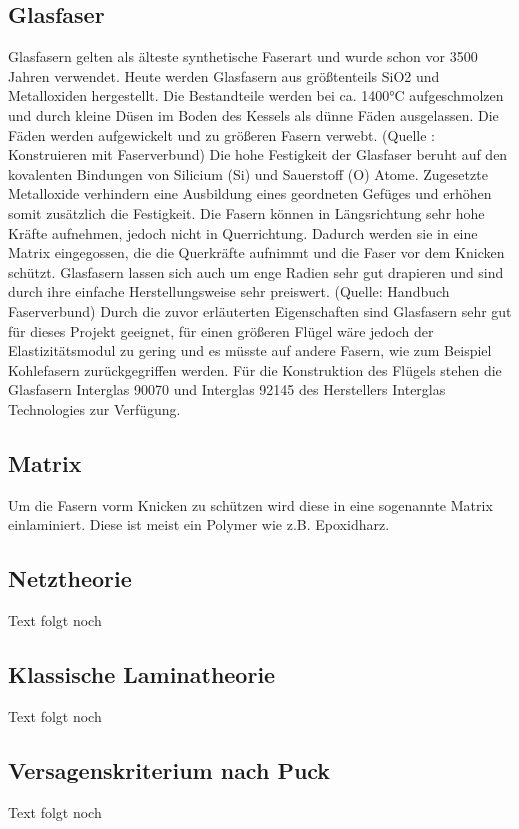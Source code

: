 \subsection{Glasfaser}
Glasfasern gelten als älteste synthetische Faserart und wurde schon vor 3500 Jahren verwendet. Heute werden Glasfasern aus größtenteils SiO2 und Metalloxiden hergestellt. Die Bestandteile werden bei ca. 1400°C aufgeschmolzen und durch kleine Düsen im Boden des Kessels als dünne Fäden ausgelassen. Die Fäden werden aufgewickelt und zu größeren Fasern verwebt. (Quelle : Konstruieren mit Faserverbund)
Die hohe Festigkeit der Glasfaser beruht auf den kovalenten Bindungen von Silicium (Si) und Sauerstoff (O) Atome. Zugesetzte Metalloxide verhindern eine Ausbildung eines geordneten Gefüges und erhöhen somit zusätzlich die Festigkeit. Die Fasern können in Längsrichtung sehr hohe Kräfte aufnehmen, jedoch nicht in Querrichtung. Dadurch werden sie in eine Matrix eingegossen, die die Querkräfte aufnimmt und die Faser vor dem Knicken schützt. Glasfasern lassen sich auch um enge Radien sehr gut drapieren und sind durch ihre einfache Herstellungsweise sehr preiswert. (Quelle: Handbuch Faserverbund)
Durch die zuvor erläuterten Eigenschaften sind Glasfasern sehr gut für dieses Projekt geeignet, für einen größeren Flügel wäre jedoch der Elastizitätsmodul zu gering und es müsste auf andere Fasern, wie zum Beispiel Kohlefasern zurückgegriffen werden. 
Für die Konstruktion des Flügels stehen die Glasfasern Interglas 90070 und Interglas 92145 des Herstellers Interglas Technologies zur Verfügung. 

\subsection{Matrix}
Um die Fasern vorm Knicken zu schützen wird diese in eine sogenannte Matrix einlaminiert. Diese ist meist ein Polymer wie z.B. Epoxidharz.
\subsection{Netztheorie}
Text folgt noch
\subsection{Klassische Laminatheorie}
Text folgt noch
\subsection{Versagenskriterium nach Puck}
Text folgt noch
